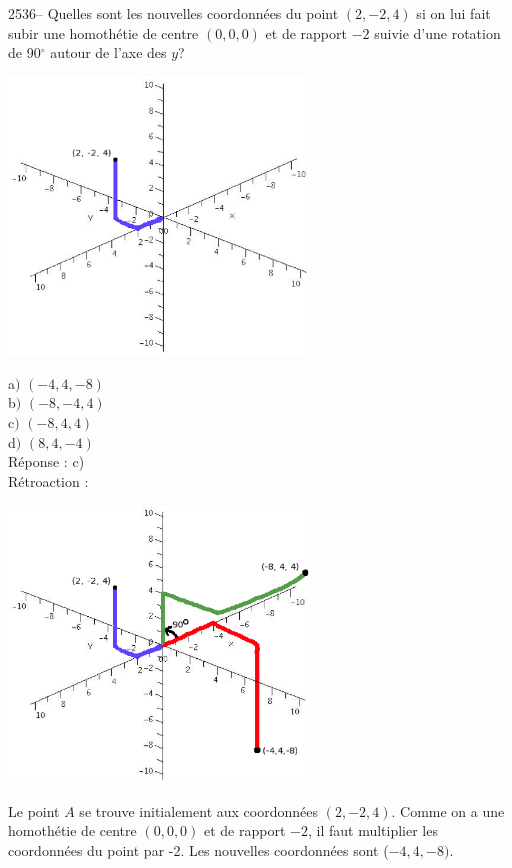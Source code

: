 \documentclass[letterpaper, 12pt]{article}
\begin{document}
2536-- Quelles sont les nouvelles coordonn\'ees du point $(2, -2 ,4)$ si on lui fait subir une homoth\'etie de centre $(0, 0, 0)$ et de rapport $-2$ suivie d'une rotation de 90$^{\circ}$ autour de l'axe des $y$? \\
\begin{center}
 \includegraphics[width=8cm,bb=14 14 614 602]{Q2535.eps}
\end{center}
a$)$ $(-4, 4, -8)$\\
b$)$ $(-8, -4, 4)$\\
c$)$ $(-8, 4, 4)$\\
d$)$ $(8, 4, -4)$\\

R\'eponse : c)\\

R\'etroaction :\\
\begin{center}
 \includegraphics[width=8cm,bb=14 14 614 602]{Q2536r.eps}
\end{center}
Le point $A$ se trouve initialement aux coordonn\'ees $(2, -2, 4)$. Comme on a une homoth\'etie de centre \mbox{$(0 , 0 , 0)$} et de rapport $-2$, il faut multiplier les coordonn\'ees du point par -2. Les nouvelles coordonn\'ees sont ($-4, 4, -8)$.\\
\end{document}
